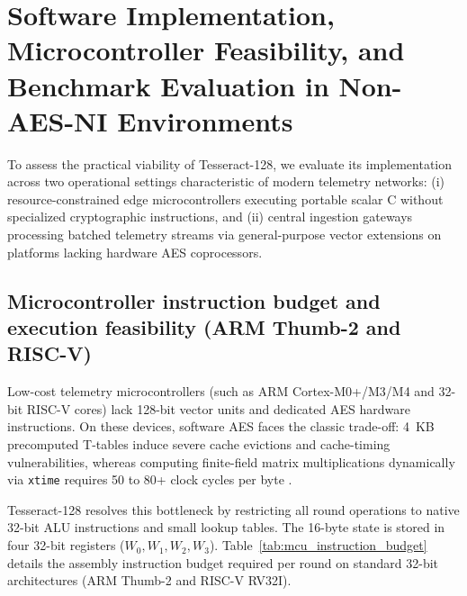 \documentclass[review,12pt]{elsarticle}
\begin{document}
\section{Software Implementation, Microcontroller Feasibility, and Benchmark Evaluation in Non-AES-NI Environments}
\label{sec:software_benchmarks}
\label{sec:aead_simd}

To assess the practical viability of Tesseract-128, we evaluate its implementation across two operational settings characteristic of modern telemetry networks: (i) resource-constrained edge microcontrollers executing portable scalar C without specialized cryptographic instructions, and (ii) central ingestion gateways processing batched telemetry streams via general-purpose vector extensions on platforms lacking hardware AES coprocessors.

\subsection{Microcontroller instruction budget and execution feasibility (ARM Thumb-2 and RISC-V)}
\label{subsec:mcu_feasibility}

Low-cost telemetry microcontrollers (such as ARM Cortex-M0+/M3/M4 and 32-bit RISC-V cores) lack 128-bit vector units and dedicated AES hardware instructions. On these devices, software AES faces the classic trade-off: 4~KB precomputed T-tables induce severe cache evictions and cache-timing vulnerabilities, whereas computing finite-field matrix multiplications dynamically via \texttt{xtime} requires 50 to 80+ clock cycles per byte \cite{kaartinen2009comparative}.

Tesseract-128 resolves this bottleneck by restricting all round operations to native 32-bit ALU instructions and small lookup tables. The 16-byte state is stored in four 32-bit registers ($W_0, W_1, W_2, W_3$). Table~\ref{tab:mcu_instruction_budget} details the assembly instruction budget required per round on standard 32-bit architectures (ARM Thumb-2 and RISC-V RV32I).
\end{document}
